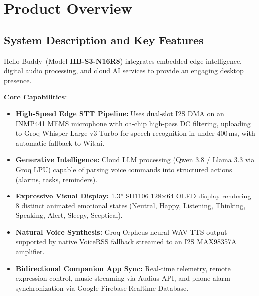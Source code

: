 \documentclass[11pt,a4paper,oneside]{report}
\newcommand{\ProductName}{Hello Buddy}
\newcommand{\ModelNo}{HB-S3-N16R8}
\begin{document}
\chapter{Product Overview}\label{ch:overview}

\section{System Description and Key Features}
\ProductName\ (Model \textbf{\ModelNo}) integrates embedded edge intelligence, digital audio processing, and cloud AI services to provide an engaging desktop presence. 

\textbf{Core Capabilities:}
\begin{itemize}[leftmargin=*]
\item \textbf{High-Speed Edge STT Pipeline:} Uses dual-slot I2S DMA on an INMP441 MEMS microphone with on-chip high-pass DC filtering, uploading to Groq Whisper Large-v3-Turbo for speech recognition in under 400\,ms, with automatic fallback to Wit.ai.
\item \textbf{Generative Intelligence:} Cloud LLM processing (Qwen 3.8 / Llama 3.3 via Groq LPU) capable of parsing voice commands into structured actions (alarms, tasks, reminders).
\item \textbf{Expressive Visual Display:} 1.3'' SH1106 128$\times$64 OLED display rendering 8 distinct animated emotional states (Neutral, Happy, Listening, Thinking, Speaking, Alert, Sleepy, Sceptical).
\item \textbf{Natural Voice Synthesis:} Groq Orpheus neural WAV TTS output supported by native VoiceRSS fallback streamed to an I2S MAX98357A amplifier.
\item \textbf{Bidirectional Companion App Sync:} Real-time telemetry, remote expression control, music streaming via Audius API, and phone alarm synchronization via Google Firebase Realtime Database.
\end{itemize}
\end{document}
